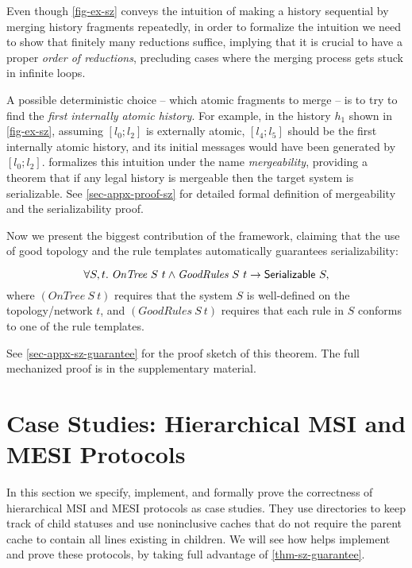 \documentclass[sigplan,10pt,review,anonymous,screen]{acmart}\settopmatter{printfolios=true,printccs=false,printacmref=false}
\begin{document}
Even though \autoref{fig-ex-sz} conveys the intuition of making a history sequential by merging history fragments repeatedly, in order to formalize the intuition we need to show that finitely many reductions suffice,
implying that it is crucial to have a proper \emph{order of reductions}, precluding cases where the merging process gets stuck in infinite loops.

A possible deterministic choice -- which atomic fragments to merge -- is to try to find the \emph{first internally atomic history}.
For example, in the history $h_1$ shown in \autoref{fig-ex-sz}, assuming $[l_0; l_2]$ is externally atomic, $[l_4; l_5]$ should be the first internally atomic history, and its initial messages would have been generated by $[l_0; l_2]$.
\hemiola{} formalizes this intuition under the name \emph{mergeability}, providing a theorem that if any legal history is mergeable then the target system is serializable.
See \autoref{sec-appx-proof-sz} for detailed formal definition of mergeability and the serializability proof.

\newcommand{\ontree}[2]{\ensuremath{\textit{OnTree}\ #1\ #2}}
\newcommand{\goodrules}[2]{\ensuremath{\textit{GoodRules}\ #1\ #2}}

Now we present the biggest contribution of the \hemiola{} framework, claiming that the use of good topology and the rule templates automatically guarantees serializability:
\begin{theorem}
  \begin{displaymath}
    \forall S, t.\; \ontree{S}{t} \land \goodrules{S}{t} \to \hsrz{S},
  \end{displaymath}
  where $(\ontree{S}{t})$ requires that the system $S$ is well-defined on the topology/network $t$, and $(\goodrules{S}{t})$ requires that each rule in $S$ conforms to one of the rule templates.
  \label{thm-sz-guarantee}
\end{theorem}
See \autoref{sec-appx-sz-guarantee} for the proof sketch of this theorem.
The full mechanized proof is in the supplementary material.

\section{Case Studies: Hierarchical MSI and MESI Protocols}
\label{sec-case-study}

In this section we specify, implement, and formally prove the correctness of hierarchical MSI and MESI protocols as case studies.
They use directories to keep track of child statuses and use noninclusive caches that do not require the parent cache to contain all lines existing in children.
We will see how \hemiola{} helps implement and prove these protocols, by taking full advantage of \autoref{thm-sz-guarantee}.
\end{document}
